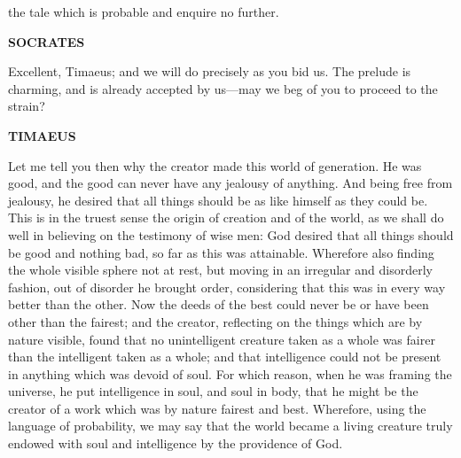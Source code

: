 \documentclass[11pt,letter]{article}
\begin{document}
the tale which is probable and enquire no further.

\par \textbf{SOCRATES}
\par   Excellent, Timaeus; and we will do precisely as you bid us. The prelude is charming, and is already accepted by us—may we beg of you to proceed to the strain?

\par \textbf{TIMAEUS}
\par   Let me tell you then why the creator made this world of generation. He was good, and the good can never have any jealousy of anything. And being free from jealousy, he desired that all things should be as like himself as they could be. This is in the truest sense the origin of creation and of the world, as we shall do well in believing on the testimony of wise men:  God desired that all things should be good and nothing bad, so far as this was attainable. Wherefore also finding the whole visible sphere not at rest, but moving in an irregular and disorderly fashion, out of disorder he brought order, considering that this was in every way better than the other. Now the deeds of the best could never be or have been other than the fairest; and the creator, reflecting on the things which are by nature visible, found that no unintelligent creature taken as a whole was fairer than the intelligent taken as a whole; and that intelligence could not be present in anything which was devoid of soul. For which reason, when he was framing the universe, he put intelligence in soul, and soul in body, that he might be the creator of a work which was by nature fairest and best. Wherefore, using the language of probability, we may say that the world became a living creature truly endowed with soul and intelligence by the providence of God.
\end{document}
